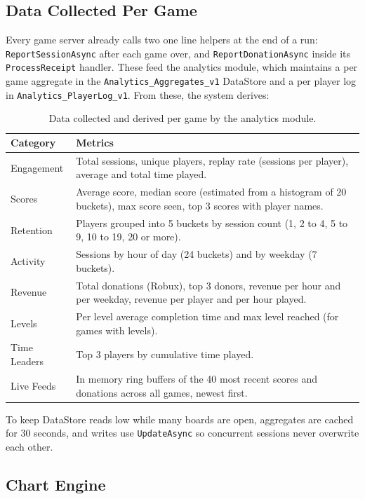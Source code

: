 \documentclass[12pt,letterpaper]{article}
\begin{document}
\subsection{Data Collected Per Game}

Every game server already calls two one line helpers at the end of a run: \texttt{ReportSessionAsync} after each game over, and \texttt{ReportDonationAsync} inside its \texttt{ProcessReceipt} handler. These feed the analytics module, which maintains a per game aggregate in the \texttt{Analytics\_Aggregates\_v1} DataStore and a per player log in \texttt{Analytics\_PlayerLog\_v1}. From these, the system derives:

\begin{table}[H]
\centering
\footnotesize
\begin{tabular}{|p{4cm}|p{11.5cm}|}
\hline
\textbf{Category} & \textbf{Metrics} \\
\hline
Engagement & Total sessions, unique players, replay rate (sessions per player), average and total time played. \\
\hline
Scores & Average score, median score (estimated from a histogram of 20 buckets), max score seen, top 3 scores with player names. \\
\hline
Retention & Players grouped into 5 buckets by session count (1, 2 to 4, 5 to 9, 10 to 19, 20 or more). \\
\hline
Activity & Sessions by hour of day (24 buckets) and by weekday (7 buckets). \\
\hline
Revenue & Total donations (Robux), top 3 donors, revenue per hour and per weekday, revenue per player and per hour played. \\
\hline
Levels & Per level average completion time and max level reached (for games with levels). \\
\hline
Time Leaders & Top 3 players by cumulative time played. \\
\hline
Live Feeds & In memory ring buffers of the 40 most recent scores and donations across all games, newest first. \\
\hline
\end{tabular}
\caption{Data collected and derived per game by the analytics module.}
\end{table}

To keep DataStore reads low while many boards are open, aggregates are cached for 30 seconds, and writes use \texttt{UpdateAsync} so concurrent sessions never overwrite each other.

\subsection{Chart Engine}
\end{document}
